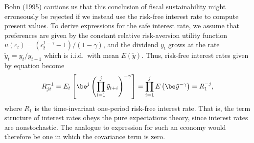 Bohn (1995) cautions us that this conclusion of fiscal sustainability might
erroneously be rejected if we instead use the risk-free interest rate to
compute present values. To derive expressions for the safe interest rate,
we assume that preferences are given by the constant relative risk-aversion
utility function $u(c_t)=(c_t^{1-\gamma}-1)/(1-\gamma)$, and the dividend $y_t$
grows at the rate $\tilde y_t=y_t/y_{t-1}$ which is i.i.d.\ with mean
$E(\tilde y)$. Thus, risk-free interest rates given by equation
 become
$$
R_{jt}^{-1} = E_t \left[ \be^j \left( \prod_{i=1}^j \tilde y_{t+i} \right)^{-\gamma}
                                                                         \right]
            = \prod_{i=1}^j E \left( \be \tilde y^{-\gamma} \right)
 = R_{1}^{-j},
$$
where $R_{1}$ is the time-invariant one-period risk-free interest rate.
That is, the term structure of interest rates obeys the pure expectations
theory, since interest rates are nonstochastic. The analogue to
expression  for such an economy would therefore be one in which the
covariance term is zero.

